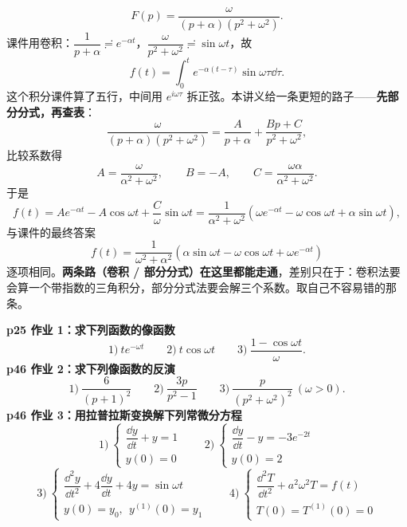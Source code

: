 \documentclass[11pt]{ctexart}
\begin{document}
\[ F(p)=\frac{\omega}{(p+\alpha)(p^{2}+\omega^{2})} .\]
课件用卷积：$\dfrac{1}{p+\alpha}\risingdotseq e^{-\alpha t}$，$\dfrac{\omega}{p^{2}+\omega^{2}}\risingdotseq\sin\omega t$，故
\[ f(t)=\int_0^{t}e^{-\alpha(t-\tau)}\sin\omega\tau\dd\tau .\]
这个积分课件算了五行，中间用 $e^{i\omega\tau}$ 拆正弦。本讲义给一条更短的路子——\textbf{先部分分式，再查表}：
\[
\frac{\omega}{(p+\alpha)(p^{2}+\omega^{2})}
=\frac{A}{p+\alpha}+\frac{Bp+C}{p^{2}+\omega^{2}} ,
\]
比较系数得
\[ A=\frac{\omega}{\alpha^{2}+\omega^{2}},\qquad B=-A,\qquad C=\frac{\omega\alpha}{\alpha^{2}+\omega^{2}} .\]
于是
\[
f(t)=Ae^{-\alpha t}-A\cos\omega t+\frac{C}{\omega}\sin\omega t
=\frac{1}{\alpha^{2}+\omega^{2}}\left(\omega e^{-\alpha t}-\omega\cos\omega t+\alpha\sin\omega t\right) ,
\]
与课件的最终答案
\[ f(t)=\frac{1}{\omega^{2}+\alpha^{2}}\left(\alpha\sin\omega t-\omega\cos\omega t+\omega e^{-\alpha t}\right) \]
逐项相同。\textbf{两条路（卷积 / 部分分式）在这里都能走通}，差别只在于：卷积法要会算一个带指数的三角积分，部分分式法要会解三个系数。取自己不容易错的那条。


\textbf{p25 作业 1：求下列函数的像函数}
\[ \text{1)}\ te^{-\omega t}\qquad \text{2)}\ t\cos\omega t\qquad \text{3)}\ \frac{1-\cos\omega t}{\omega} .\]
\textbf{p46 作业 2：求下列像函数的反演}
\[ \text{1)}\ \frac{6}{(p+1)^{2}}\qquad \text{2)}\ \frac{3p}{p^{2}-1}\qquad \text{3)}\ \frac{p}{(p^{2}+\omega^{2})^{2}}\ (\omega>0) .\]
\textbf{p46 作业 3：用拉普拉斯变换解下列常微分方程}
\[
\text{1)}\ \begin{cases}\dfrac{\dd y}{\dd t}+y=1\\[4pt] y(0)=0\end{cases}
\qquad
\text{2)}\ \begin{cases}\dfrac{\dd y}{\dd t}-y=-3e^{-2t}\\[4pt] y(0)=2\end{cases}
\]
\[
\text{3)}\ \begin{cases}\dfrac{\dd^{2}y}{\dd t^{2}}+4\dfrac{\dd y}{\dd t}+4y=\sin\omega t\\[4pt] y(0)=y_0,\ \ y^{(1)}(0)=y_1\end{cases}
\qquad
\text{4)}\ \begin{cases}\dfrac{\dd^{2}T}{\dd t^{2}}+a^{2}\omega^{2}T=f(t)\\[4pt] T(0)=T^{(1)}(0)=0\end{cases}
\]

\end{document}
